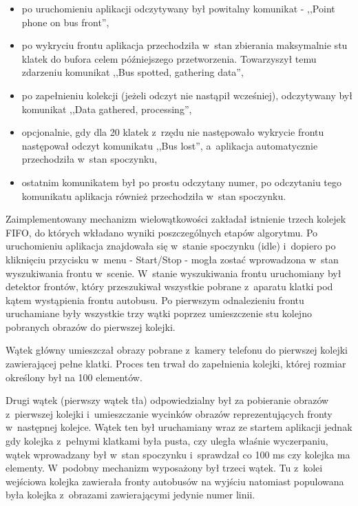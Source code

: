 \begin{itemize}
    \item po uruchomieniu aplikacji odczytywany był powitalny komunikat -
        ,,Point phone on bus front'',
    \item po wykryciu frontu aplikacja przechodziła w~stan zbierania
        maksymalnie stu klatek do bufora celem późniejszego przetworzenia.
        Towarzyszył temu zdarzeniu komunikat ,,Bus spotted, gathering
        data'',
    \item po zapełnieniu kolekcji (jeżeli odczyt nie nastąpił wcześniej),
        odczytywany był komunikat ,,Data gathered, processing'',
    \item opcjonalnie, gdy dla 20 klatek z~rzędu nie następowało wykrycie
        frontu następował odczyt komunikatu ,,Bus lost'', a~aplikacja
        automatycznie przechodziła w~stan spoczynku,
    \item ostatnim komunikatem był po prostu odczytany numer, po 
        odczytaniu tego komunikatu aplikacja również przechodziła
        w~stan spoczynku.
\end{itemize}

Zaimplementowany
mechanizm wielowątkowości zakładał istnienie trzech kolejek FIFO,
do których wkładano wyniki poszczególnych etapów algorytmu.
Po uruchomieniu aplikacja znajdowała się w~stanie spoczynku (idle)
i~dopiero po kliknięciu przycisku w~menu - Start/Stop - mogła
zostać wprowadzona w~stan wyszukiwania frontu w~scenie.
W~stanie wyszukiwania frontu uruchomiany był detektor frontów,
który przeszukiwał wszystkie pobrane z~aparatu klatki pod kątem
wystąpienia frontu autobusu. Po pierwszym odnalezieniu frontu
uruchamiane były wszystkie trzy wątki poprzez umieszczenie
stu kolejno pobranych obrazów do pierwszej kolejki.

Wątek główny umieszczał obrazy pobrane z~kamery telefonu do
pierwszej kolejki zawierającej pełne klatki. Proces ten trwał
do zapełnienia kolejki, której rozmiar określony był na 100 elementów.

Drugi wątek (pierwszy wątek tła) odpowiedzialny był za pobieranie 
obrazów z~pierwszej kolejki i~umieszczanie wycinków obrazów 
reprezentujących fronty
w~następnej kolejce. Wątek ten był uruchamiany wraz ze startem aplikacji
jednak gdy kolejka z~pełnymi klatkami była pusta, czy uległa właśnie 
wyczerpaniu, wątek wprowadzany był w~stan spoczynku i~sprawdzał co
100 ms czy kolejka ma elementy. W~podobny mechanizm wyposażony był
trzeci wątek. Tu z~kolei wejściowa kolejka zawierała fronty autobusów
na wyjściu natomiast populowana była kolejka z~obrazami zawierającymi
jedynie numer linii.

